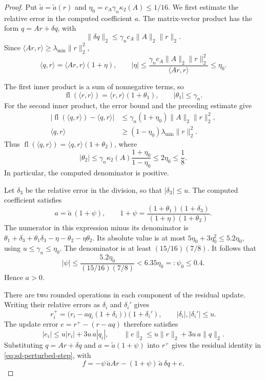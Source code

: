 \documentclass[10pt,a4paper]{amsart}
\newcommand{\fl}{\operatorname{fl}}
\begin{document}
\begin{proof}
Put $\tilde a=\tilde a(r)$ and
$\eta_0=c_A\gamma_n\kappa_2(A)\le1/16$.
We first estimate the relative error in the computed coefficient $a$.
The matrix-vector product has the form $q=Ar+\delta q$, with
\[
 \|\delta q\|_2\le\gamma_n c_A\|A\|_2\|r\|_2.
\]
Since $\langle Ar,r\rangle\ge\lambda_{\min}\|r\|_2^2$,
\[
 \langle q,r\rangle=\langle Ar,r\rangle(1+\eta),
 \qquad
 |\eta|\le
 \frac{\gamma_n c_A\|A\|_2\|r\|_2^2}{\langle Ar,r\rangle}
 \le\eta_0.
\]

The first inner product is a sum of nonnegative terms, so
\[
 \fl(\langle r,r\rangle)=\langle r,r\rangle(1+\theta_1),
 \qquad |\theta_1|\le\gamma_n.
\]
For the second inner product, the error bound and the preceding estimate
give
\[
\begin{aligned}
 |\fl(\langle q,r\rangle)-\langle q,r\rangle|
   &\le\gamma_n(1+\eta_0)\|A\|_2\|r\|_2^2,\\
 \langle q,r\rangle
   &\ge(1-\eta_0)\lambda_{\min}\|r\|_2^2.
\end{aligned}
\]
Thus $\fl(\langle q,r\rangle)=\langle q,r\rangle(1+\theta_2)$, where
\[
 |\theta_2|
 \le\gamma_n\kappa_2(A)\frac{1+\eta_0}{1-\eta_0}
 \le2\eta_0\le\frac18.
\]
In particular, the computed denominator is positive.

Let $\delta_3$ be the relative error in the division, so that
$|\delta_3|\le u$. The computed coefficient satisfies
\[
 a=\tilde a\,(1+\psi),
 \qquad
 1+\psi=\frac{(1+\theta_1)(1+\delta_3)}{(1+\eta)(1+\theta_2)} .
\]
The numerator in this expression minus its denominator is
$\theta_1+\delta_3+\theta_1\delta_3-\eta-\theta_2-\eta\theta_2$.
Its absolute value is at most $5\eta_0+3\eta_0^2\le5.2\eta_0$,
using $u\le\gamma_n\le\eta_0$.
The denominator is at least $(15/16)(7/8)$. It follows that
\[
 |\psi|\le
 \frac{5.2\eta_0}{(15/16)(7/8)}
 <6.35\eta_0=:\psi_0\le0.4.
\]
Hence $a>0$.

There are two rounded operations in each component of the residual update.
Writing their relative errors as $\delta_i$ and $\delta_i'$ gives
\[
 r_i^+=\bigl(r_i-aq_i(1+\delta_i)\bigr)(1+\delta_i'),
 \qquad |\delta_i|,|\delta_i'|\le u.
\]
The update error $e=r^+-(r-aq)$ therefore satisfies
\[
 |e_i|\le u|r_i|+3u\,a|q_i|,
 \qquad
 \|e\|_2\le u\|r\|_2+3u\,a\|q\|_2.
\]
Substituting $q=Ar+\delta q$ and $a=\tilde a(1+\psi)$ into $r^+$
gives the residual identity in \eqref{eq:sd-perturbed-step}, with
\[
 f=-\psi\,\tilde aAr-(1+\psi)\,\tilde a\,\delta q+e .
\]


\end{proof}
\end{document}
